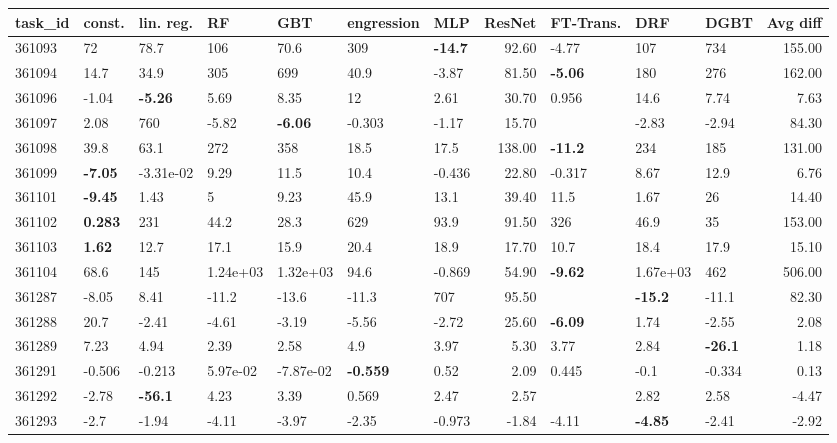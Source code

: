 \begin{table}[ht!]
\centering
\begingroup\footnotesize
\begin{tabular}{lllllllrlllr}
  \hline
\hline
task\_id & const. & lin. reg. & RF & GBT & engression & MLP & ResNet & FT-Trans. & DRF & DGBT & Avg diff \\ 
  \hline
361093 & 72 & 78.7 & 106 & 70.6 & 309 & \textbf{-14.7} & 92.60 & -4.77 & 107 & 734 & 155.00 \\ 
  361094 & 14.7 & 34.9 & 305 & 699 & 40.9 & -3.87 & 81.50 & \textbf{-5.06} & 180 & 276 & 162.00 \\ 
  361096 & -1.04 & \textbf{-5.26} & 5.69 & 8.35 & 12 & 2.61 & 30.70 & 0.956 & 14.6 & 7.74 & 7.63 \\ 
  361097 & 2.08 & 760 & -5.82 & \textbf{-6.06} & -0.303 & -1.17 & 15.70 &  & -2.83 & -2.94 & 84.30 \\ 
  361098 & 39.8 & 63.1 & 272 & 358 & 18.5 & 17.5 & 138.00 & \textbf{-11.2} & 234 & 185 & 131.00 \\ 
  361099 & \textbf{-7.05} & -3.31e-02 & 9.29 & 11.5 & 10.4 & -0.436 & 22.80 & -0.317 & 8.67 & 12.9 & 6.76 \\ 
  361101 & \textbf{-9.45} & 1.43 & 5 & 9.23 & 45.9 & 13.1 & 39.40 & 11.5 & 1.67 & 26 & 14.40 \\ 
  361102 & \textbf{0.283} & 231 & 44.2 & 28.3 & 629 & 93.9 & 91.50 & 326 & 46.9 & 35 & 153.00 \\ 
  361103 & \textbf{1.62} & 12.7 & 17.1 & 15.9 & 20.4 & 18.9 & 17.70 & 10.7 & 18.4 & 17.9 & 15.10 \\ 
  361104 & 68.6 & 145 &  1.24e+03 &  1.32e+03 & 94.6 & -0.869 & 54.90 & \textbf{-9.62} &  1.67e+03 & 462 & 506.00 \\ 
  361287 & -8.05 & 8.41 & -11.2 & -13.6 & -11.3 & 707 & 95.50 &  & \textbf{-15.2} & -11.1 & 82.30 \\ 
  361288 & 20.7 & -2.41 & -4.61 & -3.19 & -5.56 & -2.72 & 25.60 & \textbf{-6.09} & 1.74 & -2.55 & 2.08 \\ 
  361289 & 7.23 & 4.94 & 2.39 & 2.58 & 4.9 & 3.97 & 5.30 & 3.77 & 2.84 & \textbf{-26.1} & 1.18 \\ 
  361291 & -0.506 & -0.213 &  5.97e-02 & -7.87e-02 & \textbf{-0.559} & 0.52 & 2.09 & 0.445 & -0.1 & -0.334 & 0.13 \\ 
  361292 & -2.78 & \textbf{-56.1} & 4.23 & 3.39 & 0.569 & 2.47 & 2.57 &  & 2.82 & 2.58 & -4.47 \\ 
  361293 & -2.7 & -1.94 & -4.11 & -3.97 & -2.35 & -0.973 & -1.84 & -4.11 & \textbf{-4.85} & -2.41 & -2.92 \\ 

\end{tabular}
\end{table}
